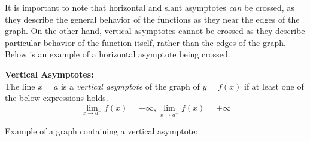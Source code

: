         \noindent It is important to note that horizontal and slant asymptotes \textit{can} be crossed,
        as they describe the general behavior of the functions as they near the edges of the graph.
        On the other hand, vertical asymptotes cannot be crossed as they describe particular
        behavior of the function itself, rather than the edges of the graph. Below is an example
        of a horizontal asymptote being crossed. \\

        \begin{center}
        \end{center}

        \noindent \color{purple} \textbf{Vertical Asymptotes:} \color{black} \\
        The line $x=a$ is a \textit{vertical asymptote} of the graph of $y=f(x)$ if at least one
        of the below expressions holds. \\

        \begin{equation*}
            \lim_{x\to a^-}f(x)=\pm\infty,
            \lim_{x\to a^+}f(x)=\pm\infty
        \end{equation*}

        \noindent Example of a graph containing a vertical asymptote: \\

